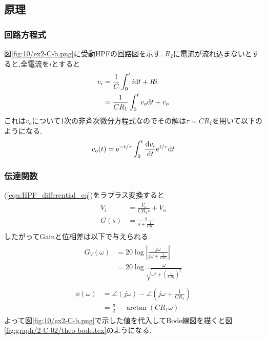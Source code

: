 \subsection{原理}
\subsubsection{回路方程式}
図\ref{fig:10/ex2-C-b.png}に受動HPFの回路図を示す.
$R_2$に電流が流れ込まないとすると,全電流を$i$とすると
\begin{align}
  \begin{split}
    \label{equ:HPF_differential_eq}
    v_i&=\frac{1}{C}\int_0^ti{\rm d}t+Ri\\
    &=\frac{1}{CR_1}\int_0^tv_o{\rm d}t+v_o
  \end{split}
\end{align}
これは$v_o$について1次の非斉次微分方程式なのでその解は$\tau=CR_1$を用いて以下のようになる.
\begin{align}
  v_o(t)={\rm e}^{-t/\tau}\int^t_0\frac{{\rm d}v_i}{{\rm d}t}{\rm e}^{t/\tau}{\rm d}t
\end{align}
\subsubsection{伝達関数}
(\ref{equ:HPF_differential_eq})をラプラス変換すると
\begin{align}
  \begin{split}
    V_i&=\frac{V_o}{CR_1s}+V_o\\
    G(s)&=\frac{s}{s+\frac{1}{CR_1}}
  \end{split}
\end{align}
したがってGainと位相差は以下で与えられる.
\begin{align}
  \begin{split}
    G_V(\omega)&=20\log\left|\frac{j\omega}{j\omega+\frac{1}{CR_1}}\right|\\
    &=20\log\frac{\omega}{\sqrt{\omega^2+\left(\frac{1}{CR_1}\right)^2}}
  \end{split}
\end{align}
\begin{align}
  \begin{split}
    \phi(\omega)&=\angle(j\omega)-\angle\left(j\omega+\frac{1}{CR_1}\right)\\
    &=\frac{\pi}{2}-\arctan(CR_1\omega)
  \end{split}
\end{align}
よって図\ref{fig:10/ex2-C-b.png}で示した値を代入してBode線図を描くと図\ref{fig:graph/2-C-02/theo-bode.tex}のようになる.
